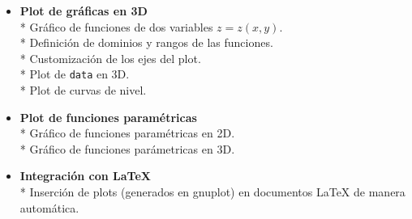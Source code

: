 \documentclass[11.5pt,a4paper]{article}
\begin{document}
\begin{itemize}
\item \textbf{Plot de gráficas en 3D}\\*
Gráfico de funciones de dos variables $z = z(x,y)$.\\*
Definición de dominios y rangos de las funciones.\\*
Customización de los ejes del plot.\\*
Plot de \texttt{data} en 3D.\\*
Plot de curvas de nivel.

\item \textbf{Plot de funciones paramétricas}\\*
Gráfico de funciones paramétricas en 2D.\\*
Gráfico de funciones parámetricas en 3D.

\item \textbf{Integración con LaTeX}\\*
Inserción de plots (generados en gnuplot) en documentos LaTeX de manera automática.

\end{itemize}
\end{document}
